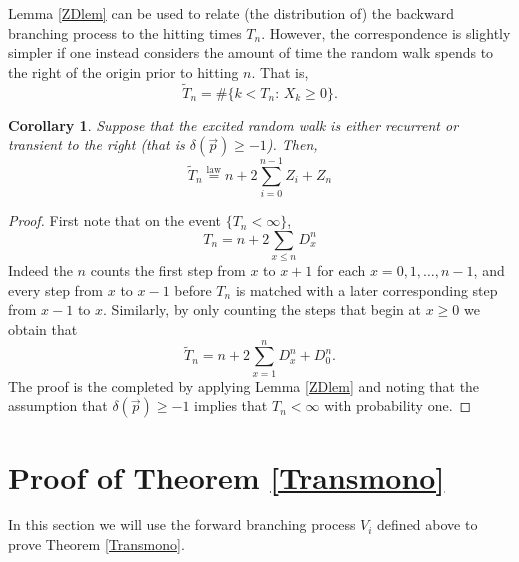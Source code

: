 \documentclass[reqno,letterpaper,11pt]{amsart}
\newtheorem{cor}[thm]{Corollary}
\theoremstyle{remark}
\theoremstyle{definition}
\begin{document}
Lemma \ref{ZDlem} can be used to relate (the distribution of) the backward branching process to the hitting times $T_n$. However, the correspondence is slightly simpler if one instead considers the amount of time the random walk spends to the right of the origin prior to hitting $n$. That is, 
\[
 \widetilde{T}_n = \# \{ k < T_n : \, X_k \geq 0 \}. 
\]
 
\begin{cor}
 Suppose that the excited random walk is either recurrent or transient to the right (that is ${\delta}({\vec{p}}) \geq -1$). Then,
\begin{equation}\label{TZ}
 \widetilde{T}_n 
\overset{\text{law}}{=} n + 2 \sum_{i=0}^{n-1} Z_i + Z_n
\end{equation}
\end{cor}
\begin{proof}
 First note that on the event $\{ T_n < \infty \}$,
\begin{equation}\label{TDrep}
 T_n = n + 2 \sum_{x\leq n} D_x^n
\end{equation}
Indeed the $n$ counts the first step from $x$ to $x+1$ for each $x=0,1,\ldots, n-1$, and every step from $x$ to $x-1$ before $T_n$ is matched with a later corresponding step from $x-1$ to $x$. 
Similarly, by only counting the steps that begin at $x \geq 0$ we obtain that
\[
  \widetilde{T}_n = n + 2 \sum_{x=1}^n D_x^n + D_0^n.
\]
The proof is the completed by applying Lemma \ref{ZDlem} and noting that the assumption that ${\delta}({\vec{p}}) \geq -1$ implies that $T_n < \infty$ with probability one.
\end{proof}

\section{Proof of Theorem \ref{Transmono}} \label{sec:TM}

In this section we will use the forward branching process $V_i$ defined above to prove Theorem \ref{Transmono}. 
\end{document}
